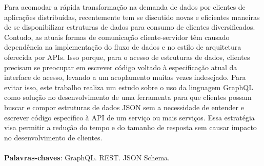 \begin{resumo}
  Para acomodar a rápida transformação na demanda de dados por clientes de aplicações distribuídas, recentemente tem se discutido novas e eficientes maneiras de se disponibilizar estruturas de dados para consumo de clientes diversificados. Contudo, as atuais formas de comunicação cliente-servidor têm causado dependência na implementação do fluxo de dados e no estilo de arquitetura oferecida por APIs. Isso porque, para o acesso de estruturas de dados, clientes precisam se preocupar em escrever código voltado à especificação atual da interface de acesso, levando a um acoplamento muitas vezes indesejado. Para evitar isso, este trabalho realiza um estudo sobre o uso da linguagem GraphQL como solução no desenvolvimento de uma ferramenta para que clientes possam buscar e compor estruturas de dados JSON sem a necessidade de entender e escrever código específico à API de um serviço ou mais serviços. Essa estratégia visa permitir a redução do tempo e do tamanho de resposta sem causar impacto no desenvolvimento de clientes. \\ \\
  \textbf{Palavras-chaves}: GraphQL. REST. JSON Schema.
\end{resumo}
